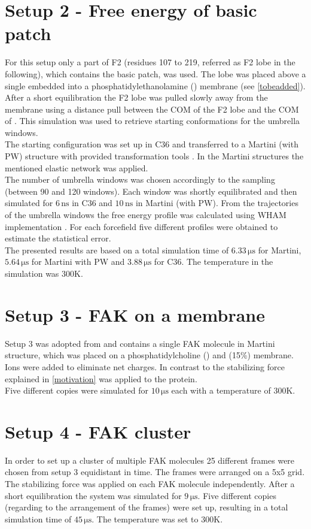 \section{Setup 2 - Free energy of basic patch}
\label{setup:setup2}
For this setup only a part of F2 (residues 107 to 219, referred as F2 lobe in the following), which contains the basic patch, was used. The lobe was placed above a single \pip{} embedded into a phosphatidylethanolamine (\pope{}) membrane (see \autoref{tobeadded}). After a short equilibration the F2 lobe was pulled slowly away from the membrane using a distance pull between the COM of the F2 lobe and the COM of \pip{}. This simulation was used to retrieve starting conformations for the umbrella windows.\\
The starting configuration was set up in C36 and transferred to a Martini (with PW) structure with provided transformation tools \autocite{backwardpy, PW}. In the Martini structures the mentioned elastic network was applied.\\
The number of umbrella windows was chosen accordingly to the sampling (between 90 and 120 windows). Each window was shortly equilibrated and then simulated for $6\,\si{\nano\second}$ in C36 and $10\,\si{\nano\second}$ in Martini (with PW). From the trajectories of the umbrella windows the free energy profile was calculated using \gromacs{} WHAM implementation \autocite{gromacsWHAMpaper}. For each forcefield five different profiles were obtained to estimate the statistical error.\\
The presented results are based on a total simulation time of $6.33\,\si{\micro\second}$ for Martini, $5.64\,\si{\micro\second}$ for Martini with PW and $3.88\,\si{\micro\second}$ for C36. The temperature in the simulation was $300\si{\kelvin}$. %
\section{Setup 3 - FAK on a \pip{} membrane}
\label{setup:setup3}
Setup 3 was adopted from \textcite{sara} and contains a single FAK molecule in Martini structure, which was placed on a phosphatidylcholine (\popc{}) and \pip{} (15\%) membrane. Ions were added to eliminate net charges. In contrast to \textcite{sara} the stabilizing force explained in \autoref{motivation} was applied to the protein.\\
Five different copies were simulated for $10\,\si{\micro\second}$ each with a temperature of $300\si{\kelvin}$.
\section{Setup 4 - FAK cluster}
In order to set up a cluster of multiple FAK molecules 25 different frames were chosen from setup 3 equidistant in time. The frames were arranged on a {5x5} grid. The stabilizing force was applied on each FAK molecule independently. After a short equilibration the system was simulated for $9\,\si{\micro\second}$. Five different copies (regarding to the arrangement of the frames) were set up, resulting in a total simulation time of $45\,\si{\micro\second}$. The temperature was set to $300\si{\kelvin}$.